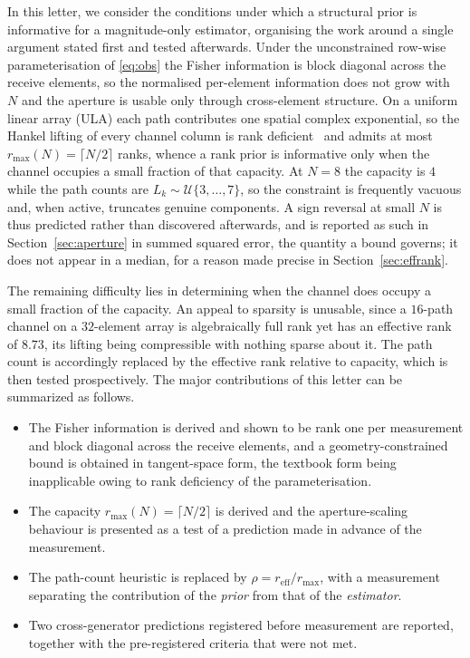 \documentclass[journal]{IEEEtran}
\newcommand{\reff}{r_{\mathrm{eff}}}
\newcommand{\rmax}{r_{\max}}
\begin{document}
In this letter, we consider the conditions under which a structural prior is
informative for a magnitude-only estimator, organising the work around a single
argument stated first and tested afterwards. Under the unconstrained row-wise
parameterisation of \eqref{eq:obs} the Fisher information is block diagonal
across the receive elements, so the normalised per-element information does not
grow with $N$ and the aperture is usable only through cross-element structure.
On a uniform linear array (ULA) each path contributes one spatial complex
exponential, so the Hankel lifting of every channel column is rank
deficient~\cite{cadzow1988,markovsky2008} and admits at most
$\rmax(N)=\lceil N/2\rceil$ ranks, whence a rank prior is informative only when
the channel occupies a small fraction of that capacity. At $N=8$ the capacity is
$4$ while the path counts are $L_k\sim\mathcal{U}\{3,\dots,7\}$, so the constraint
is frequently vacuous and, when active, truncates genuine components. A sign
reversal at small $N$ is thus predicted rather than discovered afterwards, and
is reported as such in Section~\ref{sec:aperture} in summed squared error, the
quantity a bound governs; it does not appear in a median, for a reason made
precise in Section~\ref{sec:effrank}.

The remaining difficulty lies in determining when the channel does occupy a
small fraction of the capacity. An appeal to sparsity is unusable, since a
$16$-path channel on a $32$-element array is algebraically full rank yet has an
effective rank of
$8.73$, its lifting being compressible with nothing sparse about it. The path
count is accordingly replaced by the effective rank relative to capacity, which
is then tested prospectively. The major contributions of this letter can be
summarized as follows.
\begin{itemize}\setlength{\itemsep}{1pt}\setlength{\parskip}{0pt}
\item The Fisher information is derived and shown to be rank one per
measurement and block diagonal across the receive elements, and a
geometry-constrained bound is obtained in tangent-space form, the textbook form
being inapplicable owing to rank deficiency of the parameterisation.
\item The capacity $\rmax(N)=\lceil N/2\rceil$ is derived and the
aperture-scaling behaviour is presented as a test of a prediction made in
advance of the measurement.
\item The path-count heuristic is replaced by $\rho=\reff/\rmax$, with a
measurement separating the contribution of the \emph{prior} from that of the
\emph{estimator}.
\item Two cross-generator predictions registered before measurement are
reported, together with the pre-registered criteria that were not met.
\end{itemize}
\end{document}
